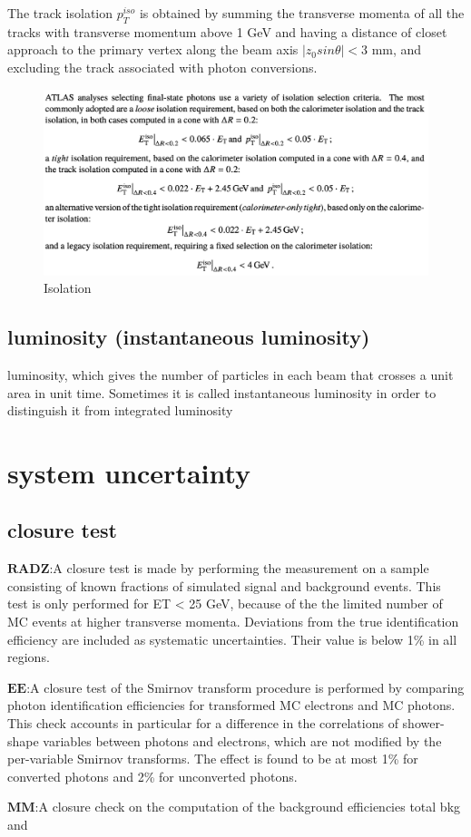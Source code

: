 \documentclass{ctexart}
\begin{document}
The track isolation $p_T^{iso}$ is obtained by summing the transverse momenta of all the tracks with transverse momentum above 1 GeV and having a distance of closet approach to the primary vertex along the beam axis $\left|z_0 sin\theta \right| < 3$ mm, and excluding the track associated with photon conversions.\\


\medskip
\begin{figure}[H] %
\centering %
\includegraphics[width=1.0\textwidth]{isolation.png} %
\caption{Isolation} %
\label{Isolation} %
\end{figure}

\subsection{luminosity (instantaneous luminosity)}
luminosity, which gives the number of particles in each beam that crosses a unit area in unit time. Sometimes it is called instantaneous luminosity in order to distinguish it from integrated luminosity
\section{system uncertainty}
\subsection{closure test}


$\mathbf{RADZ}$:A closure test is made by performing the measurement on
a sample consisting of known fractions of simulated signal
and background events. This test is only performed for
ET < 25 GeV, because of the the limited number of MC
events at higher transverse momenta. Deviations from the
true identification efficiency are included as systematic
uncertainties. Their value is below 1\% in all regions.
\par$\mathbf{EE}$:A closure test of the Smirnov transform procedure is
performed by comparing photon identification efficiencies
for transformed MC electrons and MC photons. This
check accounts in particular for a difference in the correlations
of shower-shape variables between photons and
electrons, which are not modified by the per-variable
Smirnov transforms. The effect is found to be at most
1\% for converted photons and 2\% for unconverted photons.
\par$\mathbf{MM}$:A closure check on the computation of the background
efficiencies 
total
bkg and 
\end{document}
